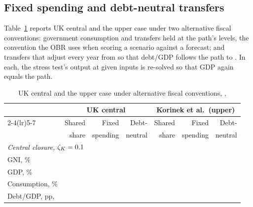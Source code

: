 \subsection{Fixed spending and debt-neutral transfers}
\label{app:fixed}

Table~\ref{tab:fixed} reports UK central and the upper case under two alternative fiscal conventions: government consumption and transfers held at the path's levels, the convention the OBR uses when scoring a scenario against a forecast; and transfers that adjust every year from \genShockYear{} so that debt/GDP follows the path to \genDebtRuleYear{}. In each, the stress test's output at given inputs is re-solved so that \genHeadYear{} GDP again equals the path.

\begin{table}[htbp]
\centering
\caption{UK central and the upper case under alternative fiscal conventions, \Main{}, \genHeadYear{}}
\label{tab:fixed}
\footnotesize
\setlength{\tabcolsep}{4pt}
\begin{tabular}{lrrrrrr}
\toprule
 & \multicolumn{3}{c}{UK central} & \multicolumn{3}{c}{Korinek et al.\ (upper)} \\
\cmidrule(lr){2-4}\cmidrule(lr){5-7}
 & Shared & Fixed & Debt- & Shared & Fixed & Debt- \\
 & share & spending & neutral & share & spending & neutral \\
\midrule
\multicolumn{7}{l}{\emph{Central closure, $\zeta_K = 0.1{}$}} \\
GNI, \%     & \genUkCentralMainGniCentral{} & \genUkCentralMainFsGniCentral{} & \genUkCentralMainDnGniCentral{} & \genKorinekMainGniCentral{} & \genKorinekMainFsGniCentral{} & \genKorinekMainDnGniCentral{} \\
GDP, \%     & \genUkCentralMainGdpCentral{} & \genUkCentralMainFsGdpCentral{} & \genUkCentralMainDnGdpCentral{} & \genKorinekMainGdpCentral{} & \genKorinekMainFsGdpCentral{} & \genKorinekMainDnGdpCentral{} \\
Consumption, \% & \genUkCentralMainConsumptionCentral{} & \genUkCentralMainFsConsumptionCentral{} & \genUkCentralMainDnConsumptionCentral{} & \genKorinekMainConsumptionCentral{} & \genKorinekMainFsConsumptionCentral{} & \genKorinekMainDnConsumptionCentral{} \\
Debt/GDP, pp, \genDebtRuleYear{} & \genUkCentralMainDebtPpThirtySixCentral{} & \genUkCentralMainFsDebtPpThirtySixCentral{} & \genUkCentralMainDnDebtPpThirtySixCentral{} & \genKorinekMainDebtPpThirtySixCentral{} & \genKorinekMainFsDebtPpThirtySixCentral{} & \genKorinekMainDnDebtPpThirtySixCentral{} \\

\end{tabular}
\end{table}
